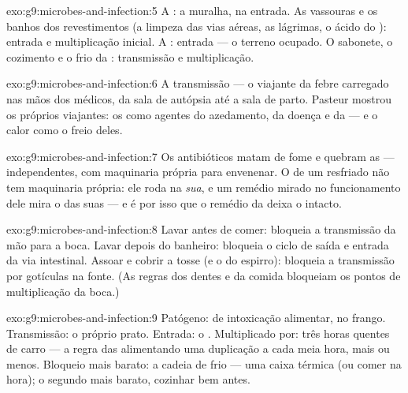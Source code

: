 \begin{solution}{exo:g9:microbes-and-infection:5}
A : a muralha, na entrada. As vassouras e os banhos dos
revestimentos (a limpeza das vias aéreas, as lágrimas, o
ácido do ): entrada e multiplicação inicial. A : entrada --- o terreno ocupado. O sabonete, o
cozimento e o frio da : transmissão e multiplicação.
\end{solution}

\begin{solution}{exo:g9:microbes-and-infection:6}
A transmissão --- o viajante da febre carregado nas mãos dos
médicos, da sala de autópsia até a sala de parto. Pasteur
mostrou os próprios viajantes: os  como agentes do
azedamento, da doença e da  --- e o calor como o
freio deles.
\end{solution}

\begin{solution}{exo:g9:microbes-and-infection:7}
Os antibióticos matam de fome e quebram as  ---
 independentes, com maquinaria própria para envenenar.
O  de um resfriado não tem maquinaria própria: ele roda
na \emph{sua}, e um remédio mirado no funcionamento dele mira
o das suas  --- e é por isso que o remédio da 
deixa o  intacto.
\end{solution}

\begin{solution}{exo:g9:microbes-and-infection:8}
Lavar antes de comer: bloqueia a transmissão da mão para a
boca. Lavar depois do banheiro: bloqueia o ciclo de saída e
entrada da via intestinal. Assoar e cobrir a tosse (e o
 do espirro): bloqueia a transmissão por gotículas na
fonte. (As regras dos dentes e da comida bloqueiam os pontos
de multiplicação da boca.)
\end{solution}

\begin{solution}{exo:g9:microbes-and-infection:9}
Patógeno:  de intoxicação alimentar, no frango.
Transmissão: o próprio prato. Entrada: o .
Multiplicado por: três horas quentes de carro --- a regra das
 alimentando uma duplicação a cada meia hora, mais
ou menos. Bloqueio mais barato: a cadeia de frio --- uma
caixa térmica (ou comer na hora); o segundo mais barato,
cozinhar bem antes.
\end{solution}

